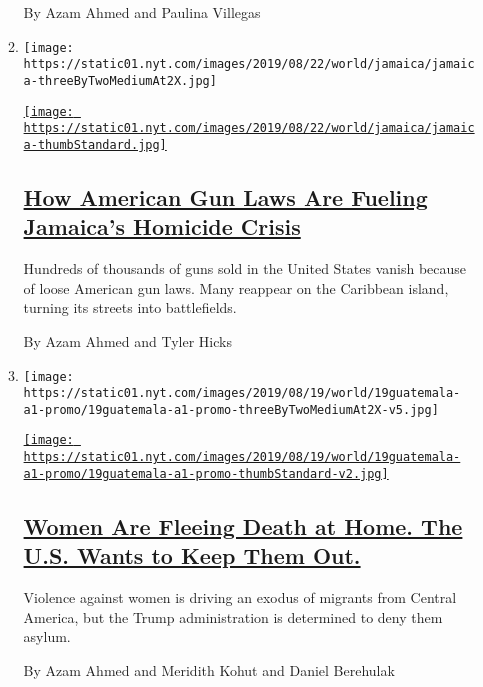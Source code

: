 \begin{enumerate}
\begin{enumerate}
    By Azam Ahmed and Paulina Villegas
  \item
    \texttt{[image: https://static01.nyt.com/images/2019/08/22/world/jamaica/jamaica-threeByTwoMediumAt2X.jpg]}

    \href{/2019/08/25/world/americas/one-handgun-9-murders-how-american-firearms-cause-carnage-abroad.html}{\texttt{[image: https://static01.nyt.com/images/2019/08/22/world/jamaica/jamaica-thumbStandard.jpg]}}

    \hypertarget{how-american-gun-laws-are-fueling-jamaicas-homicide-crisis}{%
    \subsection{\texorpdfstring{\href{/2019/08/25/world/americas/one-handgun-9-murders-how-american-firearms-cause-carnage-abroad.html}{How
    American Gun Laws Are Fueling Jamaica's Homicide
    Crisis}}{How American Gun Laws Are Fueling Jamaica's Homicide Crisis}}\label{how-american-gun-laws-are-fueling-jamaicas-homicide-crisis}}

    Hundreds of thousands of guns sold in the United States vanish
    because of loose American gun laws. Many reappear on the Caribbean
    island, turning its streets into battlefields.

    By Azam Ahmed and Tyler Hicks
  \item
    \texttt{[image: https://static01.nyt.com/images/2019/08/19/world/19guatemala-a1-promo/19guatemala-a1-promo-threeByTwoMediumAt2X-v5.jpg]}

    \href{/2019/08/18/world/americas/guatemala-violence-women-asylum.html}{\texttt{[image: https://static01.nyt.com/images/2019/08/19/world/19guatemala-a1-promo/19guatemala-a1-promo-thumbStandard-v2.jpg]}}

    \hypertarget{women-are-fleeing-death-at-home-the-us-wants-to-keep-them-out}{%
    \subsection{\texorpdfstring{\href{/2019/08/18/world/americas/guatemala-violence-women-asylum.html}{Women
    Are Fleeing Death at Home. The U.S. Wants to Keep Them
    Out.}}{Women Are Fleeing Death at Home. The U.S. Wants to Keep Them Out.}}\label{women-are-fleeing-death-at-home-the-us-wants-to-keep-them-out}}

    Violence against women is driving an exodus of migrants from Central
    America, but the Trump administration is determined to deny them
    asylum.

    By Azam Ahmed and Meridith Kohut and Daniel Berehulak
  \end{enumerate}
\end{enumerate}

